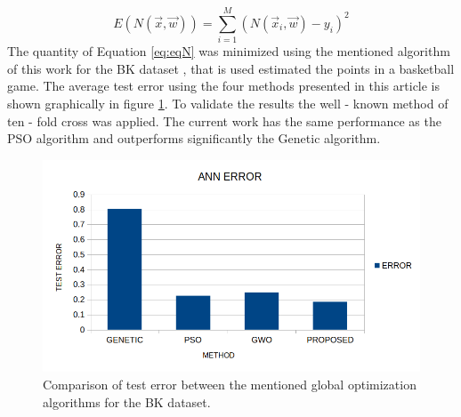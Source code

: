 \documentclass[journal,article,submit,pdftex,moreauthors]{Definitions/mdpi}
\begin{document}
\begin{equation}
E\left(N\left(\overrightarrow{x},\overrightarrow{w}\right)\right)=\sum_{i=1}^{M}\left(N\left(\overrightarrow{x}_{i},\overrightarrow{w}\right)-y_{i}\right)^{2}\label{eq:eqN}
\end{equation}
The quantity of Equation \ref{eq:eqN} was minimized using the mentioned algorithm of this work for the BK dataset \cite{bk_problem}, that is used  estimated the points  in a basketball game. The average test error using the four methods presented in this article is shown graphically in figure \ref{fig:mlpTest}. To validate the results the well - known method of ten - fold cross was applied. The current work has the same performance as the PSO algorithm and outperforms significantly the Genetic algorithm.
\begin{figure}[H]
\hspace{-5pt}\includegraphics[scale=0.5]{mlp_test.png}
\caption{Comparison of test error between the mentioned global optimization algorithms for the BK dataset. \label{fig:mlpTest}}
\end{figure}
\end{document}
